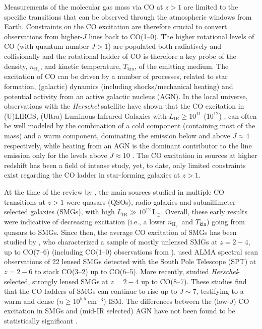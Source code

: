 \documentclass[twocolumn]{aastex62}
\newcommand{\solarlum}{\ensuremath{\mathrm{L}_{\odot}}}
\newcommand{\Lsun}{\solarlum}
\newcommand{\LIR}{\ensuremath{L_{\mathrm{IR}}}}
\newcommand{\HH}{\ensuremath{\mathrm{H}_{2}}}
\newcommand{\Tkin}{\ensuremath{T_{\mathrm{kin}}}}
\newcommand{\nHH}{\ensuremath{n_{\HH}}}
\begin{document}
Measurements of the molecular gas mass via CO at $z>1$ are limited to the
specific transitions that can be observed through the atmospheric windows from
Earth.  Constraints on the CO excitation are therefore crucial to convert
observations from higher-$J$ lines back to CO(1--0).  The higher rotational
levels of CO (with quantum number $J>1$) are populated both radiatively and
collisionally and the rotational ladder of CO is therefore a key probe of the
density, $\nHH$, and kinetic temperature, $\Tkin$, of the emitting medium.  The
excitation of CO can be driven by a number of processes, related to star
formation, (galactic) dynamics (including shocks/mechanical heating) and
potential activity from an active galactic nucleus (AGN).  In the local
universe, observations with the \emph{Herschel} satellite have shown that the
CO excitation in (U)LIRGS, (Ultra) Luminous Infrared Galaxies with
$\LIR \ge 10^{11}$ ($10^{12}$) \citep{Sanders1996}, can often be well modeled
by the combination of a cold component (containing most of the mass) and a warm
component, dominating the emission below and above $J \approx 4$ respectively,
while heating from an AGN is the dominant contributor to the line emission only
for the levels above $J \approx 10$ \citep[e.g.,][]{vanderWerf2010, Greve2014,
  Rosenberg2015, Kamenetzky2014, Kamenetzky2017, Lu2017}.  The CO excitation in
sources at higher redshift has been a field of intense study, yet, to date,
only limited constraints exist regarding the CO ladder in star-forming galaxies
at $z>1$.

At the time of the review by \cite{Carilli2013}, the main sources studied in
multiple CO transitions at $z>1$ were quasars (QSOs), radio galaxies and
submillimeter-selected galaxies (SMGs), with high $\LIR \gg 10^{12}$\,\Lsun.
Overall, these early results were indicative of decreasing excitation (i.e., a
lower \nHH\ and \Tkin) going from quasars to SMGs.  Since then, the average CO
excitation of SMGs has been studied by \cite{Bothwell2013}, who characterized a
sample of mostly unlensed SMGs at $z=2-4$, up to CO(7--6) (including CO(1--0)
observations from \citealt{Carilli2010, Riechers2010, Riechers2011a,
  Ivison2011}).  \cite{Spilker2014} used ALMA spectral scan observations of 22
lensed SMGs detected with the South Pole Telescope (SPT) at $z=2-6$
\citep{Weiss2013} to stack CO(3--2) up to CO(6--5).  More recently,
\cite{Yang2017} studied \emph{Herschel}-selected, strongly lensed SMGs at
$z=2-4$ up to CO(8--7).  These studies find that the CO ladders of SMGs can
continue to rise up to $J\sim7$, testifying to a warm and dense
($n \ge 10^{5.5}$\,cm$^{-3}$) ISM.  The differences between the (low-$J$) CO
excitation in SMGs and (mid-IR selected) AGN have not been found to be
statistically significant \citep{Sharon2016, Kirkpatrick2019}.
\end{document}
